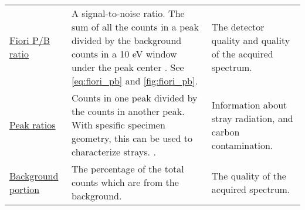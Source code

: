 \begin{table}[htp]
\begin{tabular}{p{2.5cm}p{8cm}p{4cm}}
        \hyperref[theory:eds_performance:fiori]{Fiori P/B ratio}                      & A signal-to-noise ratio. The sum of all the counts in a peak divided by the background counts in a 10 eV window under the peak center  \cite{fiori_peak_background_1982,williams_carter_tem_2009}. See \cref{eq:fiori_pb} and \cref{fig:fiori_pb}.          & The detector quality and quality of the acquired spectrum.         \\
        \hyperref[theory:eds_performance:peakratio]{Peak ratios}                      & Counts in one peak divided by the counts in another peak. With spesific specimen geometry, this can be used to characterize strays. \cite{egerton_nio_characterization_1994,ted_pella_nio_tem_2019}.                                                        & Information about stray radiation, and carbon contamination.       \\
        \hyperref[theory:eds_performance:bacgrkound_portion]{Background portion}      & The percentage of the total counts which are from the background.                                                                                                                                                                                           & The quality of the acquired spectrum.                              \\
        \hline
    \end{tabular}
\end{table}